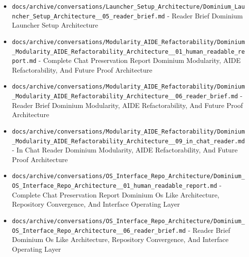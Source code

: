 \documentclass[10.5pt,a4paper,openany]{book}
\begin{document}
\begin{itemize}
\item \texttt{docs/\allowbreak{}archive/\allowbreak{}conversations/\allowbreak{}Launcher\_\allowbreak{}Setup\_\allowbreak{}Architecture/\allowbreak{}Dominium\_\allowbreak{}Launcher\_\allowbreak{}Setup\_\allowbreak{}Architecture\_\allowbreak{}\_\allowbreak{}05\_\allowbreak{}reader\_\allowbreak{}brief.\allowbreak{}md} -\allowbreak{} Reader Brief Dominium Launcher Setup Architecture
\item \texttt{docs/\allowbreak{}archive/\allowbreak{}conversations/\allowbreak{}Modularity\_\allowbreak{}AIDE\_\allowbreak{}Refactorability/\allowbreak{}Dominium\_\allowbreak{}Modularity\_\allowbreak{}AIDE\_\allowbreak{}Refactorability\_\allowbreak{}Architecture\_\allowbreak{}\_\allowbreak{}01\_\allowbreak{}human\_\allowbreak{}readable\_\allowbreak{}report.\allowbreak{}md} -\allowbreak{} Complete Chat Preservation Report Dominium Modularity, AIDE Refactorability, And Future Proof Architecture
\item \texttt{docs/\allowbreak{}archive/\allowbreak{}conversations/\allowbreak{}Modularity\_\allowbreak{}AIDE\_\allowbreak{}Refactorability/\allowbreak{}Dominium\_\allowbreak{}Modularity\_\allowbreak{}AIDE\_\allowbreak{}Refactorability\_\allowbreak{}Architecture\_\allowbreak{}\_\allowbreak{}06\_\allowbreak{}reader\_\allowbreak{}brief.\allowbreak{}md} -\allowbreak{} Reader Brief Dominium Modularity, AIDE Refactorability, And Future Proof Architecture
\item \texttt{docs/\allowbreak{}archive/\allowbreak{}conversations/\allowbreak{}Modularity\_\allowbreak{}AIDE\_\allowbreak{}Refactorability/\allowbreak{}Dominium\_\allowbreak{}Modularity\_\allowbreak{}AIDE\_\allowbreak{}Refactorability\_\allowbreak{}Architecture\_\allowbreak{}\_\allowbreak{}09\_\allowbreak{}in\_\allowbreak{}chat\_\allowbreak{}reader.\allowbreak{}md} -\allowbreak{} In Chat Reader Dominium Modularity, AIDE Refactorability, And Future Proof Architecture
\item \texttt{docs/\allowbreak{}archive/\allowbreak{}conversations/\allowbreak{}OS\_\allowbreak{}Interface\_\allowbreak{}Repo\_\allowbreak{}Architecture/\allowbreak{}Dominium\_\allowbreak{}OS\_\allowbreak{}Interface\_\allowbreak{}Repo\_\allowbreak{}Architecture\_\allowbreak{}\_\allowbreak{}01\_\allowbreak{}human\_\allowbreak{}readable\_\allowbreak{}report.\allowbreak{}md} -\allowbreak{} Complete Chat Preservation Report Dominium Os Like Architecture, Repository Convergence, And Interface Operating Layer
\item \texttt{docs/\allowbreak{}archive/\allowbreak{}conversations/\allowbreak{}OS\_\allowbreak{}Interface\_\allowbreak{}Repo\_\allowbreak{}Architecture/\allowbreak{}Dominium\_\allowbreak{}OS\_\allowbreak{}Interface\_\allowbreak{}Repo\_\allowbreak{}Architecture\_\allowbreak{}\_\allowbreak{}06\_\allowbreak{}reader\_\allowbreak{}brief.\allowbreak{}md} -\allowbreak{} Reader Brief Dominium Os Like Architecture, Repository Convergence, And Interface Operating Layer

\end{itemize}
\end{document}
